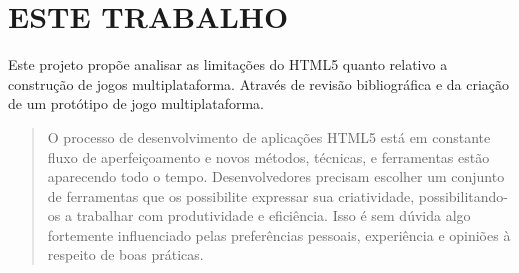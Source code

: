 \section{ESTE TRABALHO}

Este projeto propõe analisar as limitações do HTML5 quanto relativo
a construção de jogos multiplataforma. Através de revisão
bibliográfica e da criação de um protótipo de jogo multiplataforma.




\cite{crossPlatformMobileGame}
\begin{quote}
O processo de desenvolvimento de aplicações HTML5 está em constante
fluxo de aperfeiçoamento e novos métodos, técnicas, e ferramentas
estão aparecendo todo o tempo. Desenvolvedores precisam escolher um
conjunto de ferramentas que os possibilite expressar sua criatividade,
possibilitando-os a trabalhar com produtividade e eficiência. Isso é
sem dúvida algo fortemente influenciado pelas preferências pessoais,
experiência e opiniões à respeito de boas práticas.
\end{quote}
